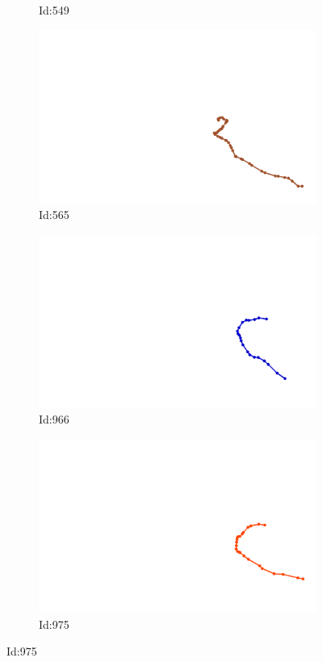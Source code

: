 \documentclass[12pt,twoside]{report}
\begin{document}
\begin{figure}
\begin{subfigure}[b]{0.20\textwidth}
\caption{Id:549}
\end{subfigure}
\begin{subfigure}[b]{0.20\textwidth}
\centering
\includegraphics[width=\textwidth]{../../trajectories/565.png}
\caption{Id:565}
\end{subfigure}
\begin{subfigure}[b]{0.20\textwidth}
\centering
\includegraphics[width=\textwidth]{../../trajectories/966.png}
\caption{Id:966}
\end{subfigure}
\begin{subfigure}[b]{0.20\textwidth}
\centering
\includegraphics[width=\textwidth]{../../trajectories/975.png}
\caption{Id:975}
\end{subfigure}
\end{figure}
\end{document}
